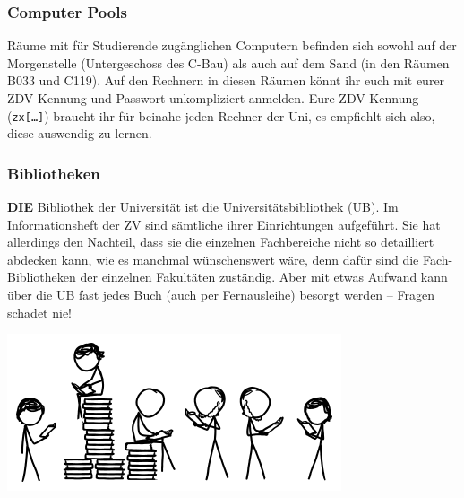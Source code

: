 \subsubsection*{Computer Pools}
Räume mit für Studierende zugänglichen Computern befinden sich sowohl auf der Morgenstelle (Untergeschoss des C-Bau) als auch auf dem Sand (in den Räumen B033 und C119). Auf den Rechnern in diesen Räumen könnt ihr euch mit eurer ZDV-Kennung und Passwort unkompliziert anmelden. Eure ZDV-Kennung (\texttt{zx[…]}) braucht ihr für beinahe jeden Rechner der Uni, es empfiehlt sich also, diese auswendig zu lernen. 

\subsubsection*{Bibliotheken}
\textbf{DIE} Bibliothek der Universität ist die
Universitätsbibliothek (UB).  Im Informationsheft der ZV sind
sämtliche ihrer Einrichtungen auf\-ge\-führt.  Sie hat
allerdings den Nachteil, dass sie die einzelnen Fachbereiche nicht so
detailliert abdecken kann, wie es manchmal wünschenswert wäre,
denn dafür sind die Fach-Bibliotheken der einzelnen Fakultäten
zuständig.  Aber mit etwas Aufwand kann über die UB fast jedes Buch
(auch per Fernausleihe) besorgt werden -- Fragen schadet nie!

\begin{center}
\includegraphics[width=0.45\hsize]{info/xkcd/books_toomany.png}
\end{center}

